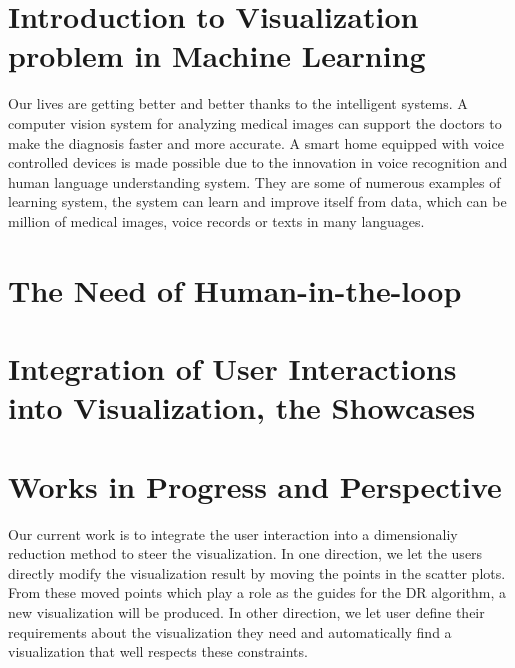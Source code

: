 \section{Introduction to Visualization problem in Machine Learning}

Our lives are getting better and better thanks to the intelligent systems.
A computer vision system for analyzing medical images can support the doctors to make the diagnosis faster and more accurate.
A smart home equipped with voice controlled devices is made possible due to the innovation in voice recognition and human language understanding system.
They are some of numerous examples of learning system, the system can learn and improve itself from data, which can be million of medical images, voice records or texts in many languages.







\section{The Need of Human-in-the-loop}





\section{Integration of User Interactions into Visualization, the Showcases}



\section{Works in Progress and Perspective}

Our current work is to integrate the user interaction into a dimensionaliy reduction method to steer the visualization.
In one direction, we let the users directly modify the visualization result by moving the points in the scatter plots.
From these moved points which play a role as the guides for the DR algorithm, a new visualization will be produced.
In other direction, we let user define their requirements about the visualization they need and automatically find a visualization that well respects these constraints.

